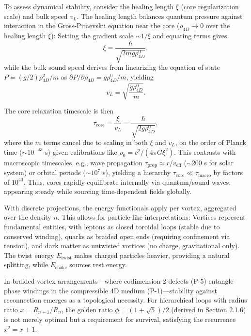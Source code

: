 To assess dynamical stability, consider the healing length $\xi$ (core regularization scale) and bulk speed $v_L$. The healing length balances quantum pressure against interaction in the Gross-Pitaevskii equation near the core ($\rho_{4D} \to 0$ over the healing length $\xi$): Setting the gradient scale $\sim 1/\xi$ and equating terms gives
\begin{equation}
\xi = \frac{\hbar}{\sqrt{2 m g \rho_{4D}^0}},
\end{equation}
while the bulk sound speed derives from linearizing the equation of state $P = (g/2) \rho_{4D}^2 / m$ as $\partial P / \partial \rho_{4D} = g \rho_{4D}^0 / m$, yielding
\begin{equation}
v_L = \sqrt{\frac{g \rho_{4D}^0}{m}}.
\end{equation}

The core relaxation timescale is then
\begin{equation}
\tau_{\text{core}} = \frac{\xi}{v_L} = \frac{\hbar}{\sqrt{2 g \rho_{4D}^0}},
\end{equation}
where the $m$ terms cancel due to scaling in both $\xi$ and $v_L$, on the order of Planck time ($\sim 10^{-43}$ s) given calibrations like $\rho_0 = c^2 / (4\pi G \xi^2)$. This contrasts with macroscopic timescales, e.g., wave propagation $\tau_{\text{prop}} \approx r / v_{\text{eff}}$ ($\sim 200$ s for solar system) or orbital periods ($\sim 10^7$ s), yielding a hierarchy $\tau_{\text{core}} \ll \tau_{\text{macro}}$ by factors of $10^{40}$. Thus, cores rapidly equilibrate internally via quantum/sound waves, appearing steady while sourcing time-dependent fields globally.

With discrete projections, the energy functionals apply per vortex, aggregated over the density $\bar{n}$. This allows for particle-like interpretations: Vortices represent fundamental entities, with leptons as closed toroidal loops (stable due to conserved winding), quarks as braided open ends (requiring confinement via tension), and dark matter as untwisted vortices (no charge, gravitational only). The twist energy $E_{\text{twist}}$ makes charged particles heavier, providing a natural splitting, while $E_{\text{shake}}$ sources rest energy.

In braided vortex arrangements---where codimension-2 defects (P-5) entangle phase windings in the compressible 4D medium (P-1)---stability against reconnection emerges as a topological necessity. For hierarchical loops with radius ratio $x = R_{n+1}/R_n$, the golden ratio $\phi = (1 + \sqrt{5})/2$ (derived in Section 2.1.6) is not merely optimal but a requirement for survival, satisfying the recurrence $x^2 = x + 1$.

